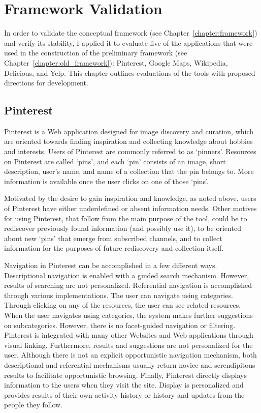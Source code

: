 \chapter{Framework Validation}
\label{chapter:evaluation}

In order to validate the conceptual framework (see Chapter~\ref{chapter:framework}) and verify its stability, I applied it to evaluate five of the applications that were used in the construction of the preliminary framework (see Chapter~\ref{chapter:old_framework}): Pinterest, Google Maps, Wikipedia, Delicious, and Yelp. This chapter outlines evaluations of the tools with proposed directions for development. 

{\section{Pinterest}
Pinterest is a Web application designed for image discovery and curation, which are oriented towards finding inspiration and collecting knowledge about hobbies and interests.  Users of Pinterest are commonly referred to as `pinners'. Resources on Pinterest are called `pins', and each `pin' consists of an image, short description, user's name, and name of a collection that the pin belongs to. More information is available once the user clicks on one of those `pins'.

Motivated by the desire to gain inspiration and knowledge, as noted above, users of Pinterest have either underdefined or absent information needs. Other motives for using Pinterest, that follow from the main purpose of the tool, could be to rediscover previously found information (and possibly use it), to be oriented about new `pins' that emerge from subscribed channels, and to collect information for the purposes of future rediscovery and collection itself.

Navigation in Pinterest can be accomplished in a few different ways. Descriptional navigation is enabled with a guided search mechanism. However, results of searching are not personalized. Referential navigation is accomplished through various implementations. The user can navigate using categories. Through clicking on any of the resources, the user can see related resources. When the user navigates using categories, the system makes further suggestions on subcategories. However, there is no facet-guided navigation or filtering. Pinterest is integrated with many other Websites and Web applications through visual linking. Furthermore, results and suggestions are not personalized for the user. Although there is not an explicit opportunistic navigation mechanism, both descriptional and referential mechanisms usually return novice and serendipitous results to facilitate opportunistic browsing. Finally, Pinterest directly displays information to the users when they visit the site. Display is personalized and provides results of their own activity history or history and updates from the people they follow.

}
